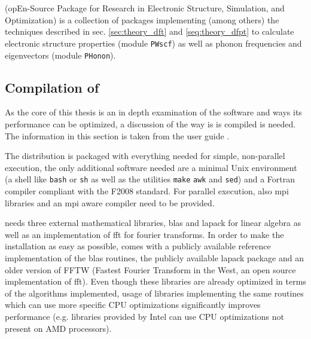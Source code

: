 \documentclass[main.tex]{subfiles}
\begin{document}
\section{\QE}\label{sec:qe}

\QE (opEn-Source Package for Research in Electronic Structure, Simulation, and Optimization) \cite{giannozzi_quantum_2009,giannozzi_advanced_2017} is a collection of packages implementing (among others) the techniques described in sec. \ref{sec:theory_dft} and \ref{seq:theory_dfpt} to calculate electronic structure properties (module \texttt{PWscf}) as well as phonon frequencies and eigenvectors (module \texttt{PHonon}).

\subsection{Compilation of \QE}\label{sub:qe_compilation}

As the core of this thesis is an in depth examination of the \QE software and ways its performance can be optimized, a discussion of the way is is compiled is needed.
The information in this section is taken from the  user guide \cite{noauthor_quantum_nodate}.

The \QE distribution is packaged with everything needed for simple, non-parallel execution, the only additional software needed are a minimal Unix environment (a shell like \texttt{bash} or \texttt{sh} as well as the utilities \texttt{make} \texttt{awk} and \texttt{sed}) and a Fortran compiler compliant with the F2008 standard.
For parallel execution, also \gls{mpi} libraries and an \gls{mpi} aware compiler need to be provided.

\QE needs three external mathematical libraries, \gls{blas} and \gls{lapack} for linear algebra as well as an implementation of \gls{fft} for fourier transforms.
In order to make the installation as easy as possible, \QE comes with a publicly available reference implementation of the \gls{blas} routines, the publicly available \gls{lapack} package and an older version of FFTW (Fastest Fourier Transform in the West, an open source implementation of \gls{fft}).
Even though these libraries are already optimized in terms of the algorithms implemented, usage of libraries implementing the same routines which can use more specific CPU optimizations significantly improves performance (e.g. libraries provided by Intel can use CPU optimizations not present on AMD processors).
\end{document}
